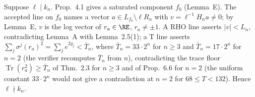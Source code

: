 Suppose $\ell\mid k_n$. \cite{KY} Prop.~4.1 gives a saturated component $f_0$ (Lemma~E). The accepted line on $f_0$ names a vector $a\in L_{f_0}\setminus\ell R_n$ with $v=\ell^{-1}H_na\ne0$; by Lemma~E, $v$ is the log vector of $r_a\in\RE$, $r_a\ne\pm1$. A RHO line asserts $|v|<L_n$, contradicting Lemma~A with \cite{MO16} Lemma~2.5(1); a T line asserts $\sum_j\sigma^j(r_a)^2=\sum_j e^{2y_j}<\bar T_n$, where $\bar T_n=33\cdot2^n$ for $n\ge3$ and $\bar T_n=17\cdot2^n$ for $n=2$ (the verifier recomputes $\bar T_n$ from $n$), contradicting the trace floor $\operatorname{Tr}(r_a^2)\ge\bar T_n$ of \cite{KY} Thm.~2.3 for $n\ge3$ and of \cite{MO3} Prop.~6.6 for $n=2$ (the uniform constant $33\cdot2^n$ would not give a contradiction at $n=2$ for $68\le T<132$). Hence $\ell\nmid k_n$.
